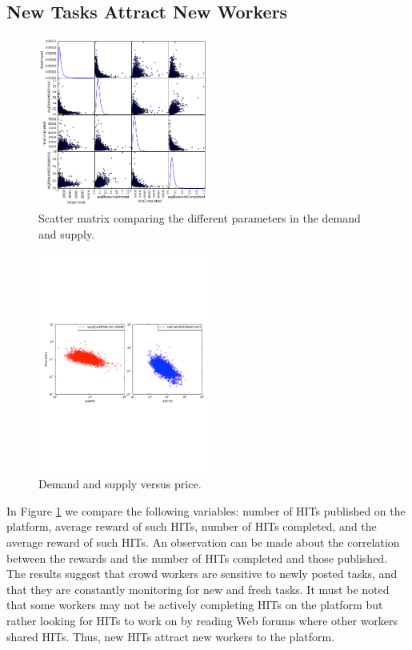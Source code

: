 \subsection{New Tasks Attract New Workers}
\begin{figure}[tb]
	\centering
		\includegraphics[width=0.5\textwidth]{figures/scattermatrix}
	\caption{Scatter matrix comparing the different parameters in the demand and supply.}
	\label{fig:scatter_matrix}
\end{figure}
\begin{figure}[tb]
	\centering
		\includegraphics[width=0.5\textwidth]{figures/supply_demand}
	\caption{Demand and supply versus price.}
	\label{fig:dsup}
\end{figure}
In Figure \ref{fig:scatter_matrix} we compare  the following variables: number of HITs published on the platform, average reward of such HITs, number of HITs completed, and the average reward of such HITs. An observation  can be made about the correlation between the rewards and the number of HITs completed and those published.
The results suggest that crowd workers are sensitive to newly posted tasks, and that they are constantly monitoring for new and fresh tasks.
It must be noted that some workers may not be actively completing HITs on the platform but rather looking for HITs to work on by reading Web forums where other workers shared HITs. Thus, new HITs attract new workers to the platform.

